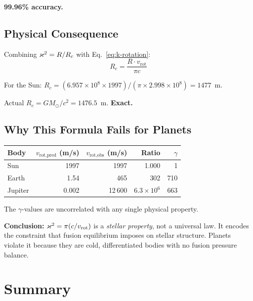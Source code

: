 \textbf{99.96\% accuracy.}

\subsection{Physical Consequence}

Combining $\varkappa^2 = R/R_c$ with Eq.~\eqref{eq:k-rotation}:
\begin{equation}
  R_c = \frac{R \cdot v_{\text{rot}}}{\pi c}
\end{equation}

For the Sun: $R_c = (6.957 \times 10^8 \times 1997)/(\pi \times 2.998 \times 10^8) = 1477$~m.

Actual $R_c = GM_\odot/c^2 = 1476.5$~m.  \textbf{Exact.}

\subsection{Why This Formula Fails for Planets}

\begin{center}
\begin{tabular}{lrrrr}
\toprule
\textbf{Body} & $v_{\text{rot,pred}}$ (m/s) & $v_{\text{rot,obs}}$ (m/s) & Ratio & $\gamma$ \\
\midrule
Sun     & 1997   & 1997    & 1.000  & 1 \\
Earth   & 1.54   & 465     & 302    & 710 \\
Jupiter & 0.002  & 12\,600 & $6.3 \times 10^6$ & 663 \\
\bottomrule
\end{tabular}
\end{center}

The $\gamma$-values are uncorrelated with any single physical property.

\textbf{Conclusion:} $\varkappa^2 = \pi(c/v_{\text{rot}})$ is a \emph{stellar property}, not a universal law.  It encodes the constraint that fusion equilibrium imposes on stellar structure.  Planets violate it because they are cold, differentiated bodies with no fusion pressure balance.


\section{Summary}
\label{sec:ch1-summary}

